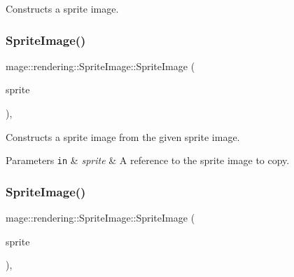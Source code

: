 Constructs a sprite image. \hypertarget{classmage_1_1rendering_1_1_sprite_image_a788c62105830b6986a686c6f249c825d}{}\label{classmage_1_1rendering_1_1_sprite_image_a788c62105830b6986a686c6f249c825d} 
\subsubsection{\texorpdfstring{Sprite\+Image()}{SpriteImage()}\hspace{0.1cm}{\footnotesize\ttfamily [2/3]}}
{\footnotesize\ttfamily mage\+::rendering\+::\+Sprite\+Image\+::\+Sprite\+Image (\begin{DoxyParamCaption}\item[{const \hyperlink{classmage_1_1rendering_1_1_sprite_image}{Sprite\+Image} \&}]{sprite }\end{DoxyParamCaption})\hspace{0.3cm}{\ttfamily [default]}, {\ttfamily [noexcept]}}

Constructs a sprite image from the given sprite image.


\begin{DoxyParams}[1]{Parameters}
\mbox{\tt in}  & {\em sprite} & A reference to the sprite image to copy. \\
\hline
\end{DoxyParams}
\hypertarget{classmage_1_1rendering_1_1_sprite_image_a267b1f56243e020f8cabef5d09c63cae}{}\label{classmage_1_1rendering_1_1_sprite_image_a267b1f56243e020f8cabef5d09c63cae} 
\subsubsection{\texorpdfstring{Sprite\+Image()}{SpriteImage()}\hspace{0.1cm}{\footnotesize\ttfamily [3/3]}}
{\footnotesize\ttfamily mage\+::rendering\+::\+Sprite\+Image\+::\+Sprite\+Image (\begin{DoxyParamCaption}\item[{\hyperlink{classmage_1_1rendering_1_1_sprite_image}{Sprite\+Image} \&\&}]{sprite }\end{DoxyParamCaption})\hspace{0.3cm}{\ttfamily [default]}, {\ttfamily [noexcept]}}


